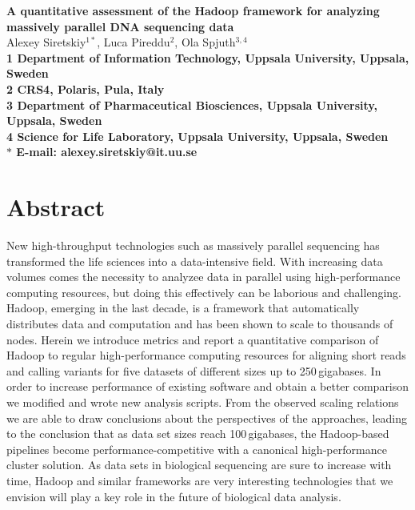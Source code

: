 \documentclass[10pt]{article}
\date{}
\begin{document}
\begin{flushleft}
{\Large
\textbf{A quantitative assessment of the Hadoop framework for analyzing massively parallel DNA sequencing data}
}
\\
Alexey Siretskiy$^{1 \ast}$, 
Luca Pireddu$^{2}$, 
Ola Spjuth$^{3,4}$
\\
\bf{1} Department of Information Technology, Uppsala University, Uppsala, Sweden
\\
\bf{2} CRS4, Polaris, Pula, Italy
\\
\bf{3} Department of Pharmaceutical Biosciences, Uppsala University, Uppsala, Sweden
\\
\bf{4} Science for Life Laboratory, Uppsala University, Uppsala, Sweden
\\
$\ast$ E-mail: alexey.siretskiy@it.uu.se
\end{flushleft}

\section*{Abstract}
New high-throughput technologies such as massively parallel sequencing has transformed the life sciences into a data-intensive field. With increasing data volumes comes the necessity to analyzee data in parallel using high-performance computing resources, but doing this effectively can be laborious and challenging. 
Hadoop, emerging in the last decade, is a framework that automatically distributes data and computation and has been shown to scale to thousands of nodes. Herein we introduce metrics and report a quantitative comparison of Hadoop to regular high-performance computing resources for aligning short reads and calling variants for five datasets of different sizes up to 250\,gigabases. In order to increase performance of existing software and obtain a better comparison we modified and wrote new analysis scripts. From the observed scaling relations we are able to draw conclusions about the perspectives of the approaches, leading to the conclusion that as data set sizes reach 100\,gigabases, the Hadoop-based pipelines become performance-competitive with a canonical high-performance cluster solution. As data sets in biological sequencing are sure to increase with time, Hadoop and similar frameworks are very interesting technologies that we envision will play a key role in the future of biological data analysis.
\end{document}
